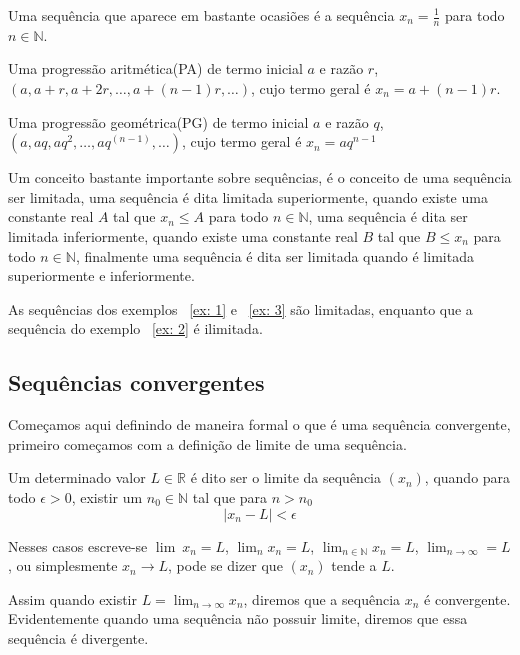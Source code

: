 \begin{ex}\label{ex: 3}
Uma sequência que aparece em bastante ocasiões é a sequência $x_n = \frac{1}{n}$
para todo $n \in \mathbb{N}$.
\end{ex}

\begin{ex}
Uma progressão aritmética(PA) de termo inicial $a$ e razão $r$,
$(a,a + r,a + 2r,\dots,a + (n-1)r, \dots)$, cujo termo geral é $x_n = a + (n-1)r$.
\end{ex}

\begin{ex}
Uma progressão geométrica(PG) de termo inicial $a$ e razão $q$,
$(a,aq,aq^2,\dots,aq^{(n-1)}, \dots)$, cujo termo geral é $x_n = aq^{n-1}$
\end{ex}

Um conceito bastante importante sobre sequências, é o conceito de uma sequência
ser limitada, uma sequência é dita limitada superiormente, quando existe uma 
constante real $A$ tal que $x_n\leq A$ para todo $n \in \mathbb{N}$, uma
sequência é dita ser limitada inferiormente, quando existe uma constante real 
$B$ tal que $B \leq x_n$ para todo $n \in \mathbb{N}$, finalmente uma sequência
é dita ser limitada quando é limitada superiormente e inferiormente.

As sequências dos exemplos ~\ref{ex: 1} e ~\ref{ex: 3} são limitadas, enquanto 
que a sequência do exemplo ~\ref{ex: 2} é ilimitada.

\subsection{Sequências convergentes}

Começamos aqui definindo de maneira formal o que é uma sequência convergente, 
primeiro começamos com a definição de limite de uma sequência.

Um determinado valor $L \in \mathbb{R}$ é dito ser o limite da sequência $(x_n)$,
quando para todo $\epsilon>0$, existir um $n_0 \in \mathbb{N}$ tal que para 
$n > n_0$
$$|x_n - L| < \epsilon$$

Nesses casos escreve-se $\lim_{\:} x_n = L$, $\lim_{n} x_n = L$,
$\lim_{n \in \mathbb{N}} x_n = L$, $\lim_{n \to \infty} = L$, ou 
simplesmente $x_n \to L$, pode se dizer que $(x_n)$ tende a $L$.

Assim quando existir $L = \lim_{n \to \infty} x_n$, diremos que a sequência $x_n$
é convergente. Evidentemente quando uma sequência não possuir limite, diremos 
que essa sequência é divergente.

